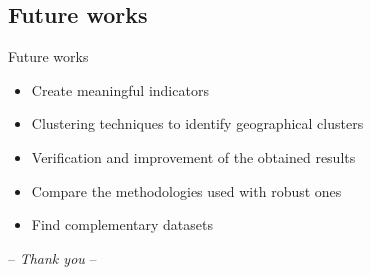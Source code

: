 \documentclass[12pt]{beamer}
\begin{document}
\subsection{Future works}


\begin{frame}{\textcolor{bscuro}{Future works}}
	\begin{itemize}
		\item Create meaningful indicators
		\item Clustering techniques to identify geographical clusters
		\item Verification and improvement of the obtained results 
		\item Compare the methodologies used with robust ones
		\item Find complementary datasets
	\end{itemize}	
\end{frame}		


\begin{frame}
	\centerline{\Huge\textcolor{bscuro}{ -- \emph{Thank you} -- }}
\end{frame}
\end{document}
